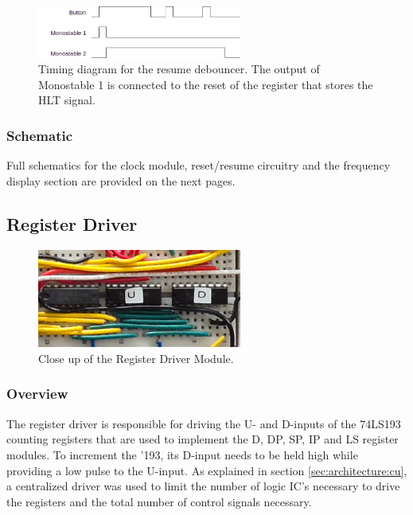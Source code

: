 \begin{figure}[H]
  \centering
  \includegraphics[width=0.6\textwidth]{img/resumedebounce}
  \caption{Timing diagram for the resume debouncer. The output of Monostable 1 is connected to the reset of the register that stores the HLT signal.}
  \label{fig:resumedebounce}
\end{figure}


\subsubsection{Schematic}
Full schematics for the clock module, reset/resume circuitry and the frequency display section are provided on the next pages.




\subsection{Register Driver} \label{sec:implementation:registerdriver}
\begin{figure}[H]
  \centering
  \includegraphics[width=0.6\textwidth]{img/registerdrivercloseup}
  \caption{Close up of the Register Driver Module.}
  \label{fig:registerdrivercloseup}
\end{figure}

\subsubsection{Overview}
The register driver is responsible for driving the U- and D-inputs of the 74LS193 counting registers that are used to implement the D, DP, SP, IP and LS register modules. To increment the '193, its D-input needs to be held high while providing a low pulse to the U-input. As explained in section \ref{sec:architecture:cu}, a centralized driver was used to limit the number of logic IC's necessary to drive the registers and the total number of control signals necessary.

